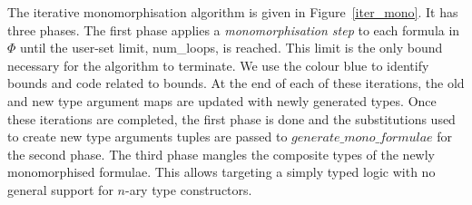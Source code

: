 \documentclass[runningheads]{llncs}
\begin{document}
The iterative monomorphisation algorithm is given in Figure~\ref{iter_mono}. It has three phases. The first phase applies a \emph{monomorphisation step} to each formula in \(\Phi\) until the user-set limit, \textcolor{ourblueviolet}{num\_loops}, is reached. This limit is the only bound necessary for the algorithm to terminate. We use the colour blue to identify bounds and code related to bounds. At the end of each of these iterations, the old and new type argument maps are updated with newly generated types. Once these iterations are completed, the first phase is done and the substitutions used to create new type arguments tuples are passed to $\mathit{generate\_mono\_formulae}$ for the second phase. The third phase mangles the composite types of the newly monomorphised formulae. This allows targeting a simply typed logic with no general support for $n$-ary type constructors.
\end{document}
